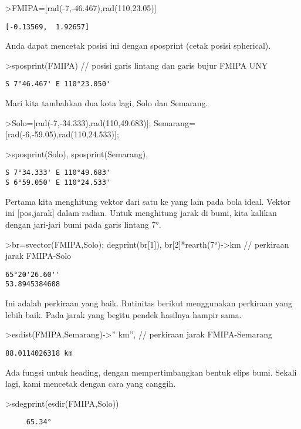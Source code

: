 \documentclass[
]{book}
\begin{document}
\textgreater FMIPA={[}rad(-7,-46.467),rad(110,23.05){]}

\begin{verbatim}
[-0.13569,  1.92657]
\end{verbatim}

Anda dapat mencetak posisi ini dengan sposprint (cetak posisi spherical).

\textgreater sposprint(FMIPA) // posisi garis lintang dan garis bujur FMIPA UNY

\begin{verbatim}
S 7°46.467' E 110°23.050'
\end{verbatim}

Mari kita tambahkan dua kota lagi, Solo dan Semarang.

\textgreater Solo={[}rad(-7,-34.333),rad(110,49.683){]}; Semarang={[}rad(-6,-59.05),rad(110,24.533){]};

\textgreater sposprint(Solo), sposprint(Semarang),

\begin{verbatim}
S 7°34.333' E 110°49.683'
S 6°59.050' E 110°24.533'
\end{verbatim}

Pertama kita menghitung vektor dari satu ke yang lain pada bola ideal. Vektor ini {[}pos,jarak{]} dalam radian. Untuk menghitung jarak di bumi, kita kalikan dengan jari-jari bumi pada garis lintang 7°.

\textgreater br=svector(FMIPA,Solo); degprint(br{[}1{]}), br{[}2{]}*rearth(7°)-\textgreater km // perkiraan jarak FMIPA-Solo

\begin{verbatim}
65°20'26.60''
53.8945384608
\end{verbatim}

Ini adalah perkiraan yang baik. Rutinitas berikut menggunakan perkiraan yang lebih baik. Pada jarak yang begitu pendek hasilnya hampir sama.

\textgreater esdist(FMIPA,Semarang)-\textgreater'' km'', // perkiraan jarak FMIPA-Semarang

\begin{verbatim}
88.0114026318 km
\end{verbatim}

Ada fungsi untuk heading, dengan mempertimbangkan bentuk elips bumi. Sekali lagi, kami mencetak dengan cara yang canggih.

\textgreater sdegprint(esdir(FMIPA,Solo))

\begin{verbatim}
     65.34°
\end{verbatim}
\end{document}
